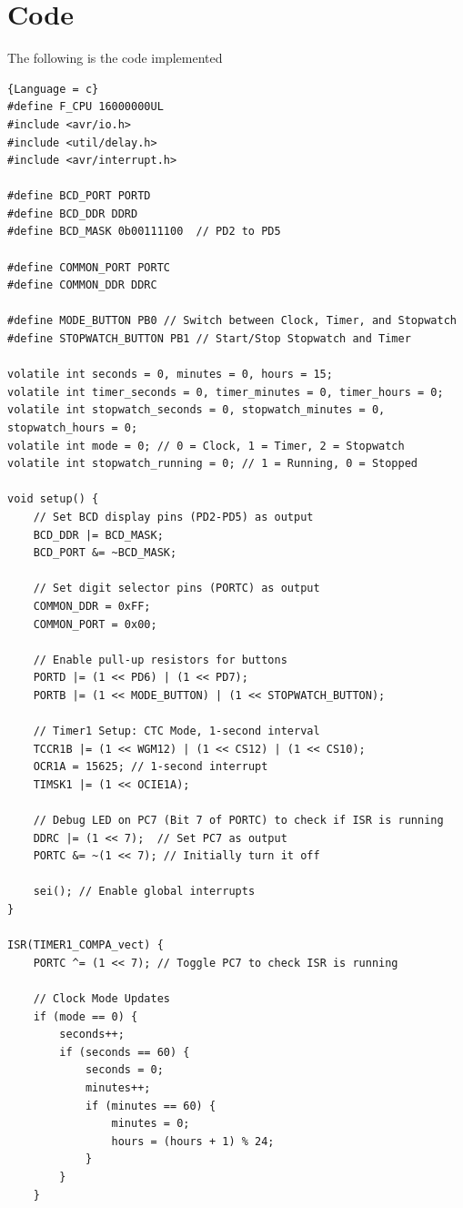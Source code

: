 \documentclass[a4paper,12pt]{article}
\begin{document}
 \section{Code}
The following is the code implemented

\begin{lstlisting}{Language = c}
#define F_CPU 16000000UL
#include <avr/io.h>
#include <util/delay.h>
#include <avr/interrupt.h>

#define BCD_PORT PORTD
#define BCD_DDR DDRD
#define BCD_MASK 0b00111100  // PD2 to PD5

#define COMMON_PORT PORTC
#define COMMON_DDR DDRC

#define MODE_BUTTON PB0 // Switch between Clock, Timer, and Stopwatch
#define STOPWATCH_BUTTON PB1 // Start/Stop Stopwatch and Timer

volatile int seconds = 0, minutes = 0, hours = 15;
volatile int timer_seconds = 0, timer_minutes = 0, timer_hours = 0;
volatile int stopwatch_seconds = 0, stopwatch_minutes = 0, stopwatch_hours = 0;
volatile int mode = 0; // 0 = Clock, 1 = Timer, 2 = Stopwatch
volatile int stopwatch_running = 0; // 1 = Running, 0 = Stopped

void setup() {
    // Set BCD display pins (PD2-PD5) as output
    BCD_DDR |= BCD_MASK;
    BCD_PORT &= ~BCD_MASK;

    // Set digit selector pins (PORTC) as output
    COMMON_DDR = 0xFF;
    COMMON_PORT = 0x00;

    // Enable pull-up resistors for buttons
    PORTD |= (1 << PD6) | (1 << PD7);
    PORTB |= (1 << MODE_BUTTON) | (1 << STOPWATCH_BUTTON);

    // Timer1 Setup: CTC Mode, 1-second interval
    TCCR1B |= (1 << WGM12) | (1 << CS12) | (1 << CS10);
    OCR1A = 15625; // 1-second interrupt
    TIMSK1 |= (1 << OCIE1A);

    // Debug LED on PC7 (Bit 7 of PORTC) to check if ISR is running
    DDRC |= (1 << 7);  // Set PC7 as output
    PORTC &= ~(1 << 7); // Initially turn it off

    sei(); // Enable global interrupts
}

ISR(TIMER1_COMPA_vect) {
    PORTC ^= (1 << 7); // Toggle PC7 to check ISR is running

    // Clock Mode Updates
    if (mode == 0) {
        seconds++;
        if (seconds == 60) {
            seconds = 0;
            minutes++;
            if (minutes == 60) {
                minutes = 0;
                hours = (hours + 1) % 24;
            }
        }
    }


\end{lstlisting}
\end{document}

